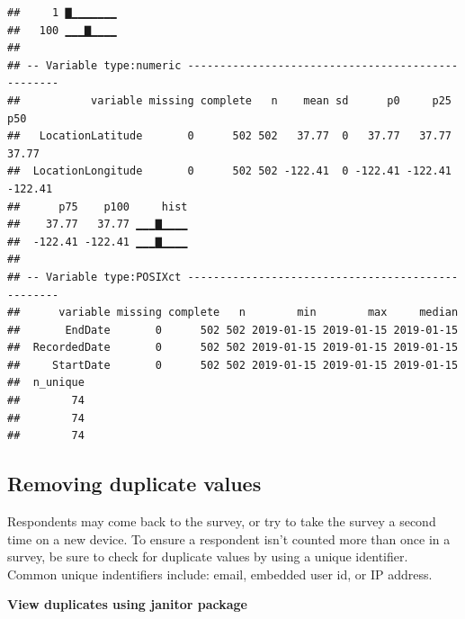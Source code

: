 \documentclass[]{book}
\newenvironment{Shaded}{\begin{snugshade}}{\end{snugshade}}
\newcommand{\KeywordTok}[1]{\textcolor[rgb]{0.13,0.29,0.53}{\textbf{#1}}}
\newcommand{\StringTok}[1]{\textcolor[rgb]{0.31,0.60,0.02}{#1}}
\newcommand{\CommentTok}[1]{\textcolor[rgb]{0.56,0.35,0.01}{\textit{#1}}}
\newcommand{\OperatorTok}[1]{\textcolor[rgb]{0.81,0.36,0.00}{\textbf{#1}}}
\newcommand{\NormalTok}[1]{#1}
\begin{document}
\begin{verbatim}
##     1 ▇▁▁▁▁▁▁▁
##   100 ▁▁▁▇▁▁▁▁
## 
## -- Variable type:numeric --------------------------------------------------
##           variable missing complete   n    mean sd      p0     p25     p50
##   LocationLatitude       0      502 502   37.77  0   37.77   37.77   37.77
##  LocationLongitude       0      502 502 -122.41  0 -122.41 -122.41 -122.41
##      p75    p100     hist
##    37.77   37.77 ▁▁▁▇▁▁▁▁
##  -122.41 -122.41 ▁▁▁▇▁▁▁▁
## 
## -- Variable type:POSIXct --------------------------------------------------
##      variable missing complete   n        min        max     median
##       EndDate       0      502 502 2019-01-15 2019-01-15 2019-01-15
##  RecordedDate       0      502 502 2019-01-15 2019-01-15 2019-01-15
##     StartDate       0      502 502 2019-01-15 2019-01-15 2019-01-15
##  n_unique
##        74
##        74
##        74
\end{verbatim}

\subsection{Removing duplicate values}\label{removing-duplicate-values}

Respondents may come back to the survey, or try to take the survey a
second time on a new device. To ensure a respondent isn't counted more
than once in a survey, be sure to check for duplicate values by using a
unique identifier. Common unique indentifiers include: email, embedded
user id, or IP address.

\textbf{View duplicates using janitor package}

\begin{Shaded}
\end{Shaded}
\end{document}
